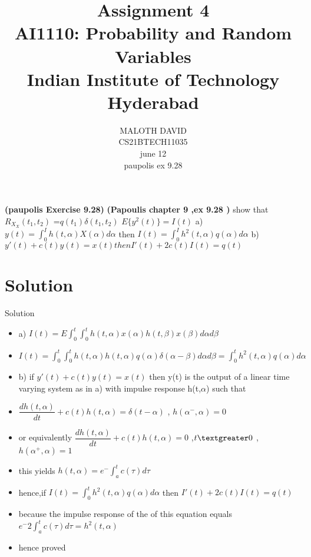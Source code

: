\documentclass[journal,12pt,twocolumn]{IEEEtran}
\title{Assignment 4 \\ \Large AI1110: Probability and Random Variables \\ \large Indian Institute of Technology Hyderabad}
\author{MALOTH DAVID \\ \normalsize CS21BTECH11035\\ \vspace*{20pt} \normalsize  june 12 \\ \vspace*{20pt} \Large paupolis ex 9.28}
\begin{document}
	\maketitle
	
	\textbf{(paupolis Exercise 9.28)}  \textbf{(Papoulis chapter 9 ,ex 9.28 )} show that $R_X_X(t_1,t_2)$ =$q(t_1)\delta(t_1,t_2)$  $E\{y^2(t)\} = I(t)$  a) $y(t) = \int_0^I h(t,\alpha)X(\alpha)d\alpha $ then $I(t)=\int_0^I h^2(t,\alpha)q(\alpha)d\alpha$
	b)$y'(t)+c(t)y(t)=x(t) then I'(t)+2c(t)I(t)=q(t)$

\section{Solution}
\begin{frame}{Solution}

\begin{itemize}

\item a) $I(t) = E{\int_0^t\int_0^t h(t,\alpha)x(\alpha)h(t,\beta)x(\beta)d\alpha d\beta }$

\item $I(t) = \int_0^t\int_0^t h(t,\alpha)h(t,\alpha) q(\alpha)\delta(\alpha -\beta)d\alpha d\beta =\int_0^t h^2(t,\alpha)q(\alpha)d\alpha$

\item b) if $ y'(t)+c(t)y(t)=x(t)$ then y(t) is the output of a linear time varying system as in a) with impulse response h(t,$\alpha$) such that 

\item $\dfrac{dh(t,\alpha)}{dt} + c(t)h(t,\alpha) = \delta(t-\alpha)$ ,  $h(\alpha^-,\alpha)=0$

\item or equivalently
$\dfrac{dh(t,\alpha)}{dt} + c(t)h(t,\alpha) = 0$ ,$ t \textgreater 0$ ,$h(\alpha^+,\alpha)=1$

\item this yields
$h(t,\alpha) = e^-{\int_a^t c(\tau)d\tau}$

\item hence,if
$I(t) = \int_0^t h^2(t,\alpha)q(\alpha)d\alpha$ then $ I'(t)+2c(t)I(t)=q(t)$ 
\item because the impulse response of the of this equation equals
$e^-{2\int_a^tc(\tau)d\tau} = h^2(t,\alpha)$
\item hence proved
\end{itemize}
    
    
\end{frame} 
\end{document}
